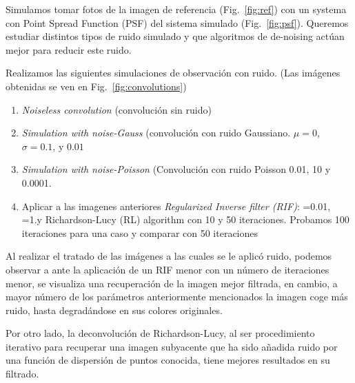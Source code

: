 \documentclass{./packages/optica-article}
\begin{document}
 Simulamos tomar fotos de la imagen de referencia (Fig.~\ref{fig:ref}) con un systema con Point Spread Function (PSF) del sistema simulado (Fig.~\ref{fig:psf}). Queremos estudiar distintos tipos de ruido simulado y que algoritmos de de-noising actúan mejor para reducir este ruido.

 Realizamos las siguientes simulaciones de observación con ruido. (Las imágenes obtenidas se ven en Fig.~\ref{fig:convolutions})

\begin{enumerate}
    \item \emph{Noiseless convolution} (convolución sin ruido)
    \item \emph{Simulation with noise-Gauss} (convolución con ruido Gaussiano. $\mu=0$, $\sigma=0.1$, y $0.01$
    \item \emph{Simulation with noise-Poisson} (Convolución con ruido Poisson 0.01, 10 y 0.0001.
    \item Aplicar a las imagenes anteriores \emph{Regularized Inverse filter (RIF)}: =0.01, =1.y Richardson-Lucy (RL) algorithm con 10 y 50 iteraciones. Probamos 100 iteraciones para una caso y comparar con 50 iteraciones
\end{enumerate}

Al realizar el tratado de las imágenes a las cuales se le aplicó ruido, podemos observar a ante la aplicación de un RIF menor con un número de iteraciones menor, se visualiza una recuperación de la imagen mejor filtrada, en cambio, a mayor número de los parámetros anteriormente mencionados la imagen coge más ruido, hasta degradándose en sus colores originales.

Por otro lado, la deconvolución de Richardson-Lucy, al ser procedimiento iterativo para recuperar una imagen subyacente que ha sido añadida ruido por una función de dispersión de puntos conocida, tiene mejores resultados en su filtrado.
\end{document}
